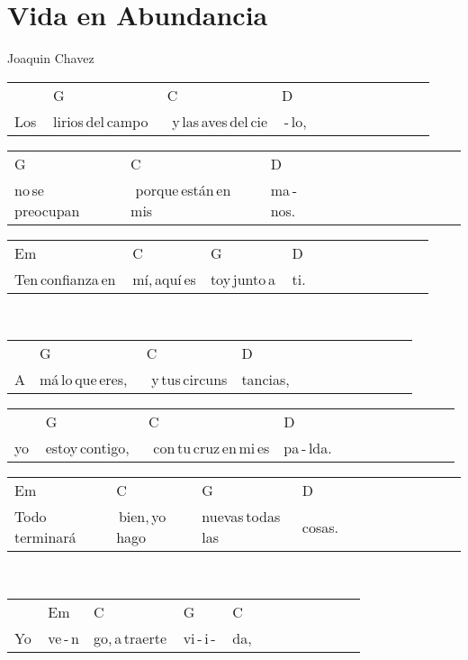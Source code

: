\section*{Vida en Abundancia}
Joaquin Chavez\hfill
\begin{multicols}{2}
\noindent
\begin{minipage}{\columnwidth}
\noindent
\noindent
\begin{tabular}{llllllllllll}
&G&C&D\\
Los\,&lirios\,del\,campo\,\,&\,\,y\,las\,aves\,del\,cie&\,-\,lo,
\end{tabular}

\noindent
\begin{tabular}{llllllllllll}
G&C&D\\
no\,se\,preocupan\,\,&\,\,porque\,están\,en\,mis\,&ma\,-\,nos.
\end{tabular}

\noindent
\begin{tabular}{llllllllllll}
Em&C&G&D\\
Ten\,confianza\,en\,&mí,\,aquí\,es&toy\,junto\,a\,&ti.
\end{tabular}
\end{minipage}\\

\noindent
\begin{minipage}{\columnwidth}
\noindent
\noindent
\begin{tabular}{llllllllllll}
&G&C&D\\
A&má\,lo\,que\,eres,\,\,&\,\,y\,tus\,circuns&tancias,
\end{tabular}

\noindent
\begin{tabular}{llllllllllll}
&G&C&D\\
yo\,&estoy\,contigo,\,\,&\,\,con\,tu\,cruz\,en\,mi\,es&pa\,-\,lda.
\end{tabular}

\noindent
\begin{tabular}{llllllllllll}
Em&C&G&D\\
Todo\,terminará&\,bien,\,yo\,hago\,&nuevas\,todas\,las\,&cosas.
\end{tabular}
\end{minipage}\\

\noindent
\begin{minipage}{\columnwidth}
\noindent
\noindent
\begin{tabular}{llllllllllll}
&Em&C&G&C\\
Yo\,&ve\,-\,n&go,\,a\,traerte\,&vi\,-\,i\,-\,&da,
\end{tabular}


\end{minipage}
\end{multicols}
